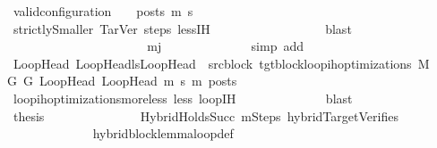 \begin{isabellebody}
\ {\isachardoublequoteopen}valid{\isacharunderscore}{\kern0pt}configuration\ {\isasymLambda}\ {\isasymGamma}\ {\isasymOmega}\ posts\ m{\isacharprime}{\kern0pt}\ s{\isacharprime}{\kern0pt}{\isachardoublequoteclose}\isanewline
\ \ \ \ \ \ \ \ \ \ \ \ \ \ \ \ \isamarkupfalse%
\ strictlySmaller\ TarVer\ steps\ less{\isachardot}{\kern0pt}IH\isanewline
\ \ \ \ \ \ \ \ \ \ \ \ \ \ \ \ \isamarkupfalse%
\ blast\isanewline
\ \ \ \ \ \ \ \ \ \ \ \ \isamarkupfalse%
\isanewline
\ \ \ \ \ \ \ \ \ \ \isamarkupfalse%
\isanewline
\ \ \ \ \ \ \ \ \ \ \isamarkupfalse%
\ {\isachardoublequoteopen}m{\isasymle}j{\isachardoublequoteclose}\isanewline
\ \ \ \ \ \ \ \ \ \ \ \ \isamarkupfalse%
\ {\isacharparenleft}{\kern0pt}simp\ add{\isacharcolon}{\kern0pt}\ {\isachardoublequoteopen}{}{\isachardoublequoteclose}{\isacharparenleft}{\kern0pt}{}{\isacharparenright}{\kern0pt}{\isacharparenright}{\kern0pt}\isanewline
\ \ \ \ \ \ \ \ \ \ \isamarkupfalse%
\ {\isachardoublequoteopen}{\isasymforall}{\isacharparenleft}{\kern0pt}LoopHead{\isacharcomma}{\kern0pt}\ LoopHead{\isacharprime}{\kern0pt}{\isacharparenright}{\kern0pt}{\isasymin}lsLoopHead\ {\isasymunion}\ {\isacharbraceleft}{\kern0pt}{\isacharparenleft}{\kern0pt}src{\isacharunderscore}{\kern0pt}block{\isacharcomma}{\kern0pt}\ tgt{\isacharunderscore}{\kern0pt}block{\isacharparenright}{\kern0pt}{\isacharbraceright}{\kern0pt}{\isachardot}{\kern0pt}loop{\isacharunderscore}{\kern0pt}ih{\isacharunderscore}{\kern0pt}optimizations\ M\ {\isasymLambda}\ {\isasymGamma}\ {\isasymOmega}\ G\ G{\isacharprime}{\kern0pt}\ LoopHead\ LoopHead{\isacharprime}{\kern0pt}\ m{\isacharprime}{\kern0pt}\ s{\isacharprime}{\kern0pt}\ m\ posts{\isachardoublequoteclose}\isanewline
\ \ \ \ \ \ \ \ \ \ \ \ \isamarkupfalse%
\ loop{\isacharunderscore}{\kern0pt}ih{\isacharunderscore}{\kern0pt}optimizations{\isacharunderscore}{\kern0pt}more{\isacharunderscore}{\kern0pt}less\ less{\isacharparenleft}{\kern0pt}{}{\isacharparenright}{\kern0pt}\ loopIH\isanewline
\ \ \ \ \ \ \ \ \ \ \ \ \isamarkupfalse%
\ blast\isanewline
\ \ \ \ \ \ \ \ \ \ \isamarkupfalse%
\ \isamarkupfalse%
\ {\isacharquery}{\kern0pt}thesis\ \isanewline
\ \ \ \ \ \ \ \ \ \ \ \ \isamarkupfalse%
\ HybridHoldsSucc\ mSteps\ hybridTargetVerifies\isanewline
\ \ \ \ \ \ \ \ \ \ \ \ \isamarkupfalse%
\ hybrid{\isacharunderscore}{\kern0pt}block{\isacharunderscore}{\kern0pt}lemma{\isacharunderscore}{\kern0pt}loop{\isacharunderscore}{\kern0pt}def\isanewline

\end{isabellebody}
